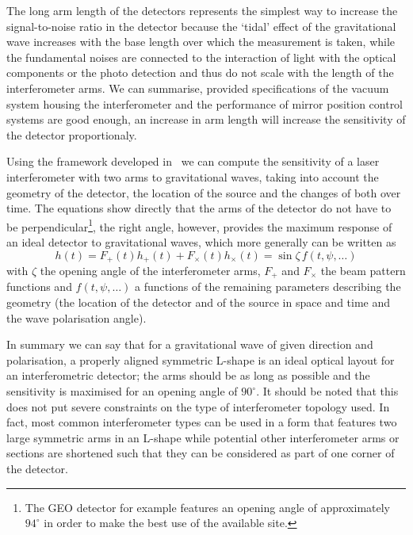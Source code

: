 The long arm length of the detectors represents the simplest way to increase the signal-to-noise ratio
in the detector because the `tidal' effect of the gravitational wave increases with the base length over which the
measurement is taken, while the fundamental noises are connected to the interaction
of light with the optical components or the photo detection and thus do not scale with the length of the interferometer
arms.
We can summarise, provided specifications of the vacuum system housing the interferometer and
the performance of mirror position control systems are good enough, an increase in arm length will increase the
sensitivity of the detector proportionaly.


Using the framework developed in~\cite{Jaranowski98} we can compute the sensitivity of a laser interferometer
with two arms to gravitational waves, taking into account the geometry of the detector, the location of the source and the
changes of both over time. The equations show directly that the arms of the detector do not
have to be perpendicular\footnote{The GEO detector for example features an opening angle of approximately $94^\circ$
in order to make the best use of the available site.}, the right angle, however, provides the maximum
response of an ideal detector to gravitational waves, which more generally can be written as
\begin{equation}
h(t)=F_{+}(t)h_{+}(t)+F_{\times}(t)h_{\times}(t)=\sin\zeta\,f(t,\psi, \dots)
\end{equation}
with $\zeta$ the opening angle of the interferometer arms, $F_{+}$ and $F_{\times}$ the beam pattern functions
and $f(t,\psi, \dots)$ a functions of the remaining parameters describing the geometry (the location of the detector and
of the source in space and time and the wave polarisation angle).

In summary we can say that for a gravitational wave of given direction and polarisation, a properly aligned  symmetric L-shape
is an ideal optical layout for an interferometric
detector; the arms should be as long as possible and the sensitivity is maximised for an opening angle of $90^\circ$.
It should be noted that this does not put severe constraints on the type of interferometer topology used. In fact,
most common interferometer types can be used in a form that features two large symmetric arms in an L-shape
while potential other interferometer arms or sections are shortened such that they can be considered as part of one
corner of the detector.

